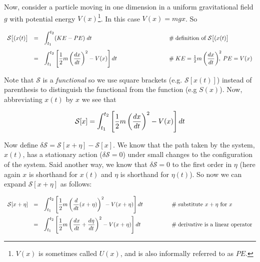 \documentclass{article}
\theoremstyle{definition}
\begin{document}
\bigskip
\noindent
Now, consider a particle moving in one dimension in a uniform
gravitational field $g$ with potential energy
$V(x)$\footnote{$V(x)$ is sometimes called $U(x)$, and is also
informally referred to as $PE$.}. In this case $V(x) = m g x$. So  


\begin{equation*}
\begin{array}{lllll}
\mathcal{S}\big [ (x(t) \big ]
&=& {\displaystyle \mathlarger {\int_{t_1}^{t_2}} (KE - PE) \; dt}
                &\qquad \qquad \qquad \qquad \mathrel{\#} \text{definition of $\mathcal{S}\big [ (x(t) \big ]$}  \\
[14pt]
&=& {\displaystyle \mathlarger{ \int_{t_1}^{t_2}} \left [ \frac{1}{2} m \left ( \dfrac{dx}{dt} \right)^2 - V(x) \right  ] dt}   
                &\qquad \qquad \qquad \qquad \mathrel{\#}  KE = \frac{1}{2} m \left ( \dfrac{dx}{dt}\right )^2\!\!\!\!, \; PE = V(x)
\end{array}
\end{equation*}


\bigskip
\noindent
Note that $\mathcal{S}$ is a \emph{functional} \cite{cov} so we
use square brackets (e.g. $\mathcal{S}[x(t)]$) instead of
parenthesis to distinguish the functional from the function (e.g
$S(x)$). Now, abbreviating $x(t)$ by $x$ we see that 

\bigskip
\begin{equation}
\mathcal{S}[x] = 
        {\displaystyle \mathlarger{ \int_{t_1}^{t_2}} \left [ \frac{1}{2} m \left ( \dfrac{dx}{dt} \right )^2 - V(x) \right  ] dt}  
\label{eqn:S(x)}
\end{equation}


\bigskip
\noindent
Now define $\delta \mathcal{S} = \mathcal{S}[x + \eta] -
\mathcal{S}[x]$. We know that the path taken by the system,
$x(t)$,  has a stationary action ($\delta \mathcal{S} = 0$) under
small changes to the configuration of the system. Said another
way, we know that $\delta \mathcal{S} = 0$ to the first order in
$\eta$ (here again $x$ is shorthand for $x(t)$ and $\eta$ is
shorthand for $\eta(t)$).  So now we can expand $\mathcal{S}[x +
\eta]$ as follows: 


\bigskip
\begin{equation}
\begin{array}{lllll}
\mathcal{S}[x + \eta]
&=& {\displaystyle \mathlarger{ \int_{t_1}^{t_2}} \left [ \frac{1}{2} m \left ( \dfrac{d}{dt} (x+\eta) \right )^2 - V(x+\eta) \right  ] dt}   
                                                        &\qquad \qquad \mathrel{\#} \text{substitute $x + \eta$ for $x$}  \\
[14pt]
&=& {\displaystyle \mathlarger{ \int_{t_1}^{t_2}} \left [ \frac{1}{2} m \left ( \dfrac{dx}{dt} + \dfrac{d\eta}{dt} \right )^2 - V(x+\eta) \right  ] dt}   
                                                        &\qquad  \qquad \mathrel{\#} \text{derivative is a linear operator} 
\end{array}
\label{eqn:s_x_plus_eta}
\end{equation}
\end{document}
